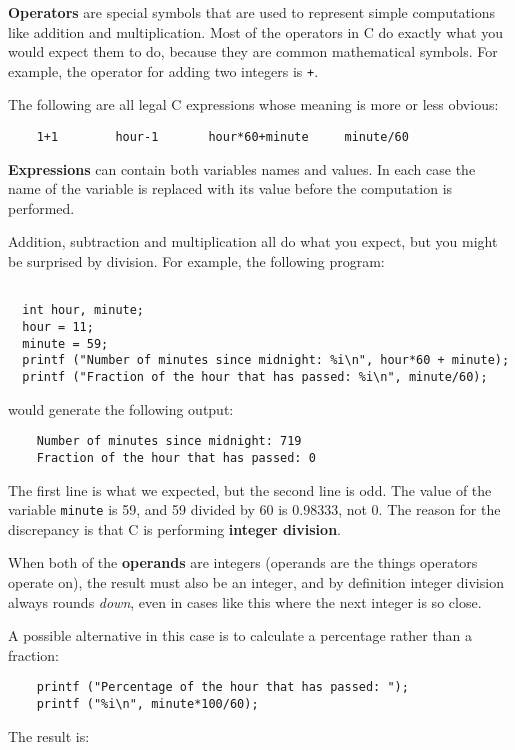 {\bf Operators} are special symbols that are used to represent
simple computations like addition and multiplication.  Most
of the operators in C do exactly what you would expect them
to do, because they are common mathematical symbols.  For
example, the operator for adding two integers is {\tt +}.

The following are all legal C expressions whose meaning is
more or less obvious:

\begin{verbatim}
    1+1        hour-1       hour*60+minute     minute/60
\end{verbatim}
%
{\bf Expressions} can contain both variables
names and values.  In each case the name of the variable is
replaced with its value before the computation is performed.


Addition, subtraction and multiplication all do what you
expect, but you might be surprised by division.  For example,
the following program:

\begin{verbatim}

  int hour, minute;
  hour = 11;
  minute = 59;
  printf ("Number of minutes since midnight: %i\n", hour*60 + minute);
  printf ("Fraction of the hour that has passed: %i\n", minute/60);

\end{verbatim}
%
would generate the following output:

\begin{verbatim}
    Number of minutes since midnight: 719
    Fraction of the hour that has passed: 0
\end{verbatim}
%
The first line is what we expected, but the second line is
odd.  The value of the variable {\tt minute} is 59, and
59 divided by 60 is 0.98333, not 0.  The reason for the
discrepancy is that C is performing {\bf integer division}.


When both of the {\bf operands} are integers (operands are the things
operators operate on), the result must also be an integer,
and by definition integer division always rounds {\em down},
even in cases like this where the next integer is so close.

A possible alternative in this case is to calculate a percentage
rather than a fraction:

\begin{verbatim}
    printf ("Percentage of the hour that has passed: ");
    printf ("%i\n", minute*100/60);
\end{verbatim}
%
The result is:

